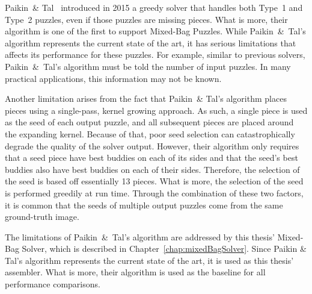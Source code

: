 Paikin~\& Tal~\cite{paikin2015} introduced in 2015 a greedy solver that handles both Type~1 and Type~2 puzzles, even if those puzzles are missing pieces.  What is more, their algorithm is one of the first to support Mixed-Bag Puzzles.  While Paikin~\&~Tal's algorithm represents the current state of the art, it has serious limitations that affects its performance for these puzzles.  For example, similar to previous solvers, Paikin~\&~Tal's algorithm must be told the number of input puzzles.  In many practical applications, this information may not be known.

Another limitation arises from the fact that Paikin~\& Tal's algorithm places pieces using a single-pass, kernel growing approach.  As such, a single piece is used as the seed of each output puzzle, and all subsequent pieces are placed around the expanding kernel.  Because of that, poor seed selection can catastrophically degrade the quality of the solver output.  However, their algorithm only requires that a seed piece have best buddies on each of its sides and that the seed's best buddies also have best buddies on each of their sides.  Therefore, the selection of the seed is based off essentially 13 pieces.  What is more, the selection of the seed is performed greedily at run time.  Through the combination of these two factors, it is common that the seeds of multiple output puzzles come from the same ground-truth image.

The limitations of Paikin~\&~Tal's algorithm are addressed by this thesis' Mixed-Bag Solver, which is described in Chapter~\ref{chap:mixedBagSolver}.  Since Paikin \&  Tal's algorithm represents the current state of the art, it is used as this thesis' assembler.  What is more, their algorithm is used as the baseline for all performance comparisons. 